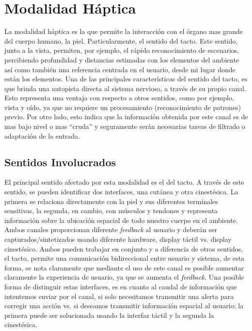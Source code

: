 
\chapter{Modalidad H\'{a}ptica} %

\label{ch:mod_haptic} 

La modalidad háptica es la que permite la interacción con el órgano mas grande del cuerpo humano, la piel. Particularmente, el sentido del tacto. Este sentido, junto a la vista, permiten, por ejemplo, el rápido reconocimiento de escenarios, percibiendo profundidad y distancias estimadas con los elementos del ambiente así como también una referencia centrada en el usuario, \ie desde mi lugar donde están los elementos.
Una de las principales características del sentido del tacto, es que brinda una autopista directa al sistema nervioso, a través de su propio canal. Esto representa una ventaja con respecto a otros sentidos, como por ejemplo, vista y oído, ya que no requiere un procesamiento (reconocimiento de patrones) previo. Por otro lado, esto indica que la información obtenida por este canal es de mas bajo nivel o mas ``cruda'' y seguramente serán necesarias tareas de filtrado o adaptación de la entrada.



\section{Sentidos Involucrados}
El principal sentido afectado por esta modalidad es el del tacto. A través de este sentido, se pueden identificar dos interfaces, una cutánea y otra cinestésica. La primera se relaciona directamente con la piel y sus diferentes terminales sensitivas, la segunda, en cambio, con músculos y tendones y representa información sobre la ubicación espacial de todo nuestro cuerpo en el ambiente. Ambos canales proporcionan diferente \emph{feedback} al usuario y deberán ser capturados/sintetizados usando diferente hardware, \ie display táctil vs. display cinestésico. Ambos pueden trabajar en conjunto y a diferencia de otros sentidos, el tacto, permite una comunicación bidireccional entre usuario y sistema, de esta forma, se nota claramente que mediante el uso de este canal es posible aumentar claramente la experiencia de usuario, ya que se aumenta el \emph{feedback}. Una posible forma de distinguir estas interfaces, es en cuanto al caudal de información que intentemos enviar por el canal, \ie si solo necesitamos transmitir una alerta para corregir una acción vs. si deseamos transmitir información espacial al usuario; la primera puede ser solucionada usando la interfaz táctil y la segunda la cinestésica.

